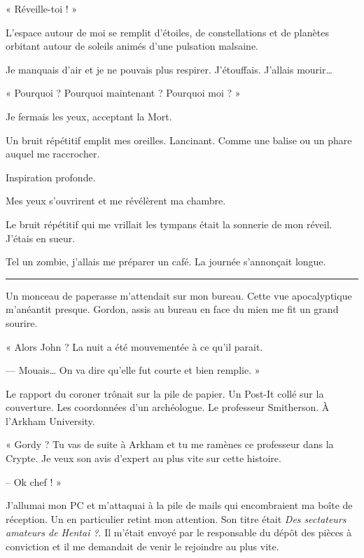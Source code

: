 « Réveille-toi ! »

L'espace autour de moi se remplit d'étoiles, de constellations et de planètes orbitant autour de soleils animés d'une 
pulsation malsaine.

Je manquais d'air et je ne pouvais plus respirer. J'étouffais. J'allais mourir…

« Pourquoi ? Pourquoi maintenant ? Pourquoi moi ? »

Je fermais les yeux, acceptant la Mort.

Un bruit répétitif emplit mes oreilles. Lancinant. Comme une balise ou un phare auquel me raccrocher.

Inspiration profonde.

Mes yeux s'ouvrirent et me révélèrent ma chambre.

Le bruit répétitif qui me vrillait les tympans était la sonnerie de mon réveil. J'étais en sueur.

Tel un zombie, j'allais me préparer un café. La journée s'annonçait longue.

\fancybreak{$* * *$}

Un monceau de paperasse m'attendait sur mon bureau. Cette vue apocalyptique m'anéantit presque. Gordon, assis au bureau 
en face du mien me fit un grand sourire.

« Alors John ? La nuit a été mouvementée à ce qu'il parait.

— Mouais… On va dire qu'elle fut courte et bien remplie. »

Le rapport du coroner trônait sur la pile de papier. Un Post-It collé sur la couverture. Les coordonnées d'un 
archéologue. Le professeur Smitherson. À l'Arkham University.

« Gordy ? Tu vas de suite à Arkham et tu me ramènes ce professeur dans la Crypte. Je veux son avis d'expert au plus 
vite sur cette histoire.

-- Ok chef ! »

J'allumai mon PC et m'attaquai à la pile de mails qui encombraient ma boîte de réception. Un en particulier retint mon 
attention. Son titre était \emph{Des sectateurs amateurs de Hentai ?}. Il m'était envoyé par le responsable du dépôt des
pièces à conviction et il me demandait de venir le rejoindre au plus vite.
